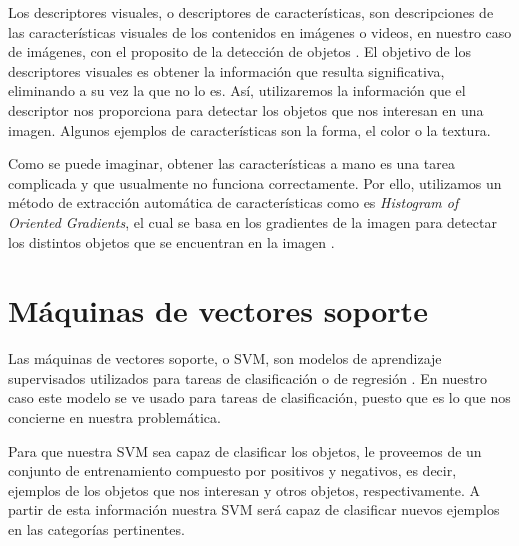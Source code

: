 Los descriptores visuales, o descriptores de características, son descripciones de las características visuales de los contenidos en imágenes o videos, en nuestro caso de imágenes, con el proposito de la detección de objetos \cite{wiki:visualdescriptor}. El objetivo de los descriptores visuales es obtener la información que resulta significativa, eliminando a su vez la que no lo es. Así, utilizaremos la información que el descriptor nos proporciona para detectar los objetos que nos interesan en una imagen. Algunos ejemplos de características son la forma, el color o la textura.

Como se puede imaginar, obtener las características a mano es una tarea complicada y que usualmente no funciona correctamente. Por ello, utilizamos un método de extracción automática de características como es \textit{Histogram of Oriented Gradients}, el cual se basa en los gradientes de la imagen para detectar los distintos objetos que se encuentran en la imagen \cite{wiki:hog}.

\section{Máquinas de vectores soporte}

Las máquinas de vectores soporte, o SVM, son modelos de aprendizaje supervisados utilizados para tareas de clasificación o de regresión \cite{wiki:svm}. En nuestro caso este modelo se ve usado para tareas de clasificación, puesto que es lo que nos concierne en nuestra problemática.

Para que nuestra SVM sea capaz de clasificar los objetos, le proveemos de un conjunto de entrenamiento compuesto por positivos y negativos, es decir, ejemplos de los objetos que nos interesan y otros objetos, respectivamente. A partir de esta información nuestra SVM será capaz de clasificar nuevos ejemplos en las categorías pertinentes.